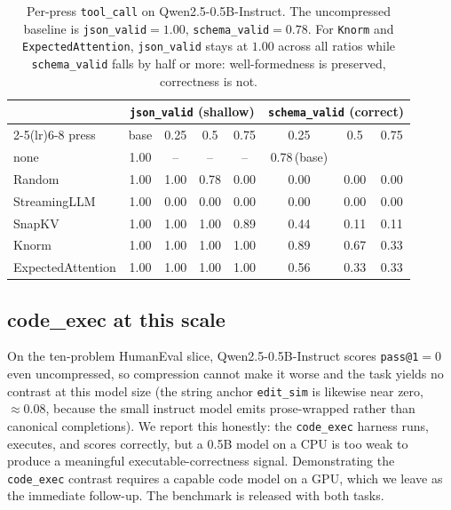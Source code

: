 \documentclass[11pt]{article}
\begin{document}
\begin{table}[t]
  \centering
  \small
  \begin{tabular}{lccccccc}
    \toprule
    & \multicolumn{4}{c}{\texttt{json\_valid} (shallow)} & \multicolumn{3}{c}{\texttt{schema\_valid} (correct)} \\
    \cmidrule(lr){2-5}\cmidrule(lr){6-8}
    press & base & 0.25 & 0.5 & 0.75 & 0.25 & 0.5 & 0.75 \\
    \midrule
    none              & 1.00 & --   & --   & --   & 0.78\,(base) & & \\
    Random            & 1.00 & 1.00 & 0.78 & 0.00 & 0.00 & 0.00 & 0.00 \\
    StreamingLLM      & 1.00 & 0.00 & 0.00 & 0.00 & 0.00 & 0.00 & 0.00 \\
    SnapKV            & 1.00 & 1.00 & 1.00 & 0.89 & 0.44 & 0.11 & 0.11 \\
    Knorm             & 1.00 & 1.00 & 1.00 & 1.00 & 0.89 & 0.67 & 0.33 \\
    ExpectedAttention & 1.00 & 1.00 & 1.00 & 1.00 & 0.56 & 0.33 & 0.33 \\
    \bottomrule
  \end{tabular}
  \caption{Per-press \texttt{tool\_call} on Qwen2.5-0.5B-Instruct. The uncompressed baseline is
  \texttt{json\_valid}$=1.00$, \texttt{schema\_valid}$=0.78$. For \texttt{Knorm} and
  \texttt{ExpectedAttention}, \texttt{json\_valid} stays at $1.00$ across all ratios while
  \texttt{schema\_valid} falls by half or more: well-formedness is preserved, correctness is not.}
  \label{tab:perpress}
\end{table}

\subsection{code\_exec at this scale}

On the ten-problem HumanEval slice, Qwen2.5-0.5B-Instruct scores \texttt{pass@1}$=0$ even uncompressed,
so compression cannot make it worse and the task yields no contrast at this model size (the string
anchor \texttt{edit\_sim} is likewise near zero, $\approx 0.08$, because the small instruct model
emits prose-wrapped rather than canonical completions). We report this honestly: the \texttt{code\_exec}
harness runs, executes, and scores correctly, but a 0.5B model on a CPU is too weak to produce a
meaningful executable-correctness signal. Demonstrating the \texttt{code\_exec} contrast requires a
capable code model on a GPU, which we leave as the immediate follow-up. The benchmark is released with
both tasks.
\end{document}
